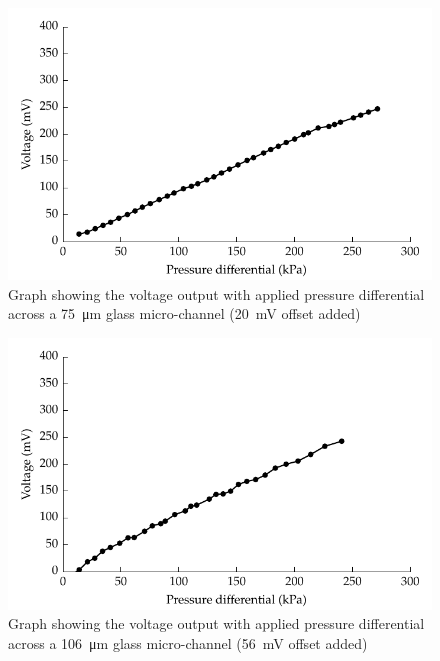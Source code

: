\begin{figure}
    \centering
    \includegraphics{content/pt1/01-PowerHarvesting/graphics/streamingCell_voltVsPress_75um_out}
    \caption{\label{fig:VvsP_75um}Graph showing the voltage output with applied pressure differential across a \SI{75}{\micro\metre} glass micro-channel (\SI{20}{\milli\volt} offset added)}
\end{figure}

\begin{figure}
    \centering
    \includegraphics{content/pt1/01-PowerHarvesting/graphics/streamingCell_voltVsPress_106um_out}
    \caption{\label{fig:VvsP_106um}Graph showing the voltage output with applied pressure differential across a \SI{106}{\micro\metre} glass micro-channel (\SI{56}{\milli\volt} offset added)}
\end{figure}


